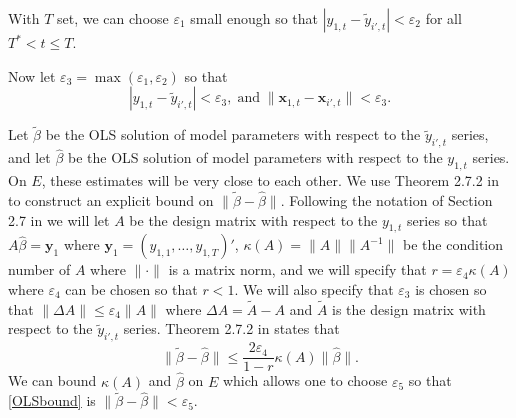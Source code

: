 \documentclass[11pt]{article}
\newcommand{\x}{\textbf{x}}
\theoremstyle{definition}
\begin{document}
With $T$ set, we can choose $\varepsilon_1$ small enough so that 
$
  |y_{1,t} - \tilde{y}_{i',t}| < \varepsilon_2
$
for all $T^* < t \leq T $. 

Now let $\varepsilon_3 = \max(\varepsilon_1,\varepsilon_2)$ so that 
\begin{equation} \label{bounds}
	|y_{1,t} - \tilde{y}_{i',t}| < \varepsilon_3, \; \text{and} \; \|\x_{1,t} - \x_{i',t}\| < \varepsilon_3.
\end{equation}

Let $\tilde{\beta}$ be the OLS solution of model parameters with respect to the $\tilde{y}_{i',t}$ series, and let $\hat{\beta}$ be the OLS solution of model parameters with respect to the $y_{1,t}$ series. On $E$, these estimates will be very close to each other. We use Theorem 2.7.2 in \cite{golub1996matrix} to construct an explicit bound on $\|\tilde{\beta} - \hat{\beta}\|$. Following the notation of Section 2.7 in \cite{golub1996matrix} we will let $A$ be the design matrix with respect to the $y_{1,t}$ series so that $A\hat{\beta} = \mathbf{y}_1$ where $\mathbf{y}_1 = (y_{1,1}, \ldots, y_{1,T})'$, $\kappa(A) = \|A\|\|A^{-1}\|$ be the condition number of $A$ where $\|\cdot\|$ is a matrix norm, and we will specify that $r = \varepsilon_4 \kappa(A)$ where $\varepsilon_4$ can be chosen so that $r < 1$. We will also specify that $\varepsilon_3$ is chosen so that $\|\Delta A\| \leq \varepsilon_4\|A\|$ where $\Delta A = \widetilde{A} - A$ and $\widetilde{A}$ is the design matrix with respect to the $\tilde{y}_{i',t}$ series. Theorem 2.7.2 in \cite{golub1996matrix} states that 
\begin{equation}\label{OLSbound}
  \|\tilde{\beta} - \hat{\beta}\| \leq \frac{2\varepsilon_4}{1-r}\kappa(A)\|\hat{\beta}\|.	
\end{equation}
We can bound $\kappa(A)$ and $\hat{\beta}$ on $E$ which allows one to choose $\varepsilon_5$ so that \eqref{OLSbound} is $\|\tilde{\beta} - \hat{\beta}\| < \varepsilon_5$. 
\end{document}
